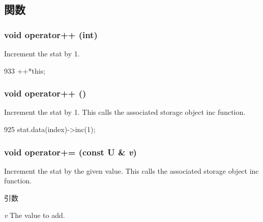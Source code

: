\subsection{関数}
\hypertarget{classStats_1_1ScalarProxy_a2aefc5a84a51687145f8514f4029c26c}{
\subsubsection[{operator++}]{\setlength{\rightskip}{0pt plus 5cm}void operator++ (int)}}
\label{classStats_1_1ScalarProxy_a2aefc5a84a51687145f8514f4029c26c}
Increment the stat by 1. 


\begin{DoxyCode}
933 { ++*this; }
\end{DoxyCode}
\hypertarget{classStats_1_1ScalarProxy_a00f008b80917746917b874d00abd02a9}{
\subsubsection[{operator++}]{\setlength{\rightskip}{0pt plus 5cm}void operator++ ()}}
\label{classStats_1_1ScalarProxy_a00f008b80917746917b874d00abd02a9}
Increment the stat by 1. This calls the associated storage object inc function. 


\begin{DoxyCode}
925 { stat.data(index)->inc(1); }
\end{DoxyCode}
\hypertarget{classStats_1_1ScalarProxy_a057ed2b8eaf6c5c5bad1c143d8449cb6}{
\subsubsection[{operator+=}]{\setlength{\rightskip}{0pt plus 5cm}void operator+= (const U \& {\em v})}}
\label{classStats_1_1ScalarProxy_a057ed2b8eaf6c5c5bad1c143d8449cb6}
Increment the stat by the given value. This calls the associated storage object inc function. 
\begin{DoxyParams}{引数}
\item[{\em v}]The value to add. \end{DoxyParams}




